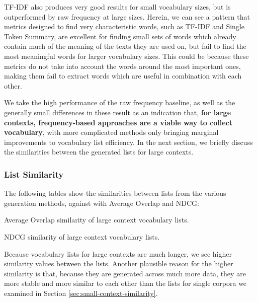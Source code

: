 TF-IDF also produces very good results for small vocabulary sizes, but is outperformed by raw frequency at large sizes.
Herein, we can see a pattern that metrics designed to find very characteristic words, such as TF-IDF and Single Token Summary, are excellent for finding small sets of words which already contain much of the meaning of the texts they are used on, but fail to find the most meaningful words for larger vocabulary sizes.
This could be because these metrics do not take into account the words around the most important ones, making them fail to extract words which are useful in combination with each other.

We take the high performance of the raw frequency baseline, as well as the generally small differences in these result as an indication that, \textbf{for large contexts, frequency-based approaches are a viable way to collect vocabulary}, with more complicated methods only bringing marginal improvements to vocabulary list efficiency.
In the next section, we briefly discuss the similarities between the generated lists for large contexts.

\subsubsection{List Similarity}
The following tables show the similarities between lists from the various generation methods, against with Average Overlap and NDCG:

\begin{table}[H]
	\centering
	\resizebox{\textwidth}{!}{%
		
	}
	\caption{Average Overlap similarity of large context vocabulary lists.}
	\label{tbl:similarity-results-big-average-overlap}
\end{table}

\begin{table}[H]
	\centering
	\resizebox{\textwidth}{!}{%
		
	}
	\caption{NDCG similarity of large context vocabulary lists.}
	\label{tbl:similarity-results-big-ndcg}
\end{table}


Because vocabulary lists for large contexts are much longer, we see higher similarity values between the lists. 
Another plausible reason for the higher similarity is that, because they are generated across much more data, they are more stable and more similar to each other than the lists for single corpora we examined in Section \ref{sec:small-context-similarity}.

